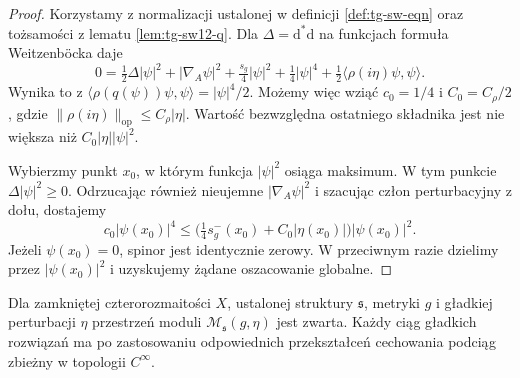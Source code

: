 \begin{proof}
Korzystamy z normalizacji ustalonej w definicji
\ref{def:tg-sw-eqn} oraz tożsamości z lematu
\ref{lem:tg-sw12-q}. Dla $\Delta=\mathrm d^*\mathrm d$
na funkcjach formuła Weitzenböcka daje
\[
0=\tfrac12\Delta|\psi|^2+|\nabla_A\psi|^2
+\tfrac{s_g}{4}|\psi|^2+\tfrac14|\psi|^4
+\tfrac12\langle\rho(i\eta)\psi,\psi\rangle.
\]
Wynika to z
$\langle\rho(q(\psi))\psi,\psi\rangle=|\psi|^4/2$.
Możemy więc wziąć $c_0=1/4$ i $C_0=C_\rho/2$,
gdzie $\|\rho(i\eta)\|_{\mathrm{op}}\leq C_\rho|\eta|$.
Wartość bezwzględna ostatniego składnika jest
nie większa niż $C_0|\eta||\psi|^2$.

Wybierzmy punkt $x_0$, w którym funkcja $|\psi|^2$
osiąga maksimum. W tym punkcie $\Delta|\psi|^2\geq0$.
Odrzucając również nieujemne $|\nabla_A\psi|^2$
i szacując człon perturbacyjny z dołu, dostajemy
\[
c_0|\psi(x_0)|^4\le
\bigl(\tfrac14s_g^-(x_0)+C_0|\eta(x_0)|\bigr)
|\psi(x_0)|^2.
\]
Jeżeli $\psi(x_0)=0$, spinor jest identycznie zerowy.
W przeciwnym razie dzielimy przez $|\psi(x_0)|^2$
i uzyskujemy żądane oszacowanie globalne.
\end{proof}

\begin{twierdzenie}
\label{thm:tg-sw-compact}
Dla zamkniętej czterorozmaitości $X$, ustalonej struktury
$\mathfrak s$, metryki $g$ i gładkiej perturbacji $\eta$
przestrzeń moduli $\mathcal M_{\mathfrak s}(g,\eta)$
jest zwarta. Każdy ciąg gładkich rozwiązań ma po
zastosowaniu odpowiednich przekształceń cechowania
podciąg zbieżny w topologii $C^\infty$.
\end{twierdzenie}

